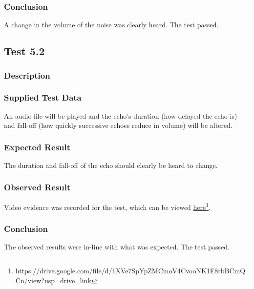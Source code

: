 \subsubsection{Conclusion}
A change in the volume of the noise was clearly heard. The test passed.


\pagebreak
\subsection{Test 5.2}
\subsubsection{Description}
\paragraph{}
{
	\centering
}

\subsubsection{Supplied Test Data}
An audio file will be played and the echo's duration (how delayed the echo is) and fall-off (how quickly successive echoes reduce in volume) will be altered.

\subsubsection{Expected Result}
The duration and fall-off of the echo should clearly be heard to change.

\subsubsection{Observed Result}
\label{sec:evidence5.2}
Video evidence was recorded for the test, which can be viewed \href{https://drive.google.com/file/d/1XVe7SpYpZMCmoV4CvooNK1E8rbBCmQCn/view?usp=drive_link}{here}\footnote{
	https://drive.google.com/file/d/1XVe7SpYpZMCmoV4CvooNK1E8rbBCmQCn/view?usp=drive\_link
}.

\subsubsection{Conclusion}
The observed results were in-line with what was expected. The test passed.


